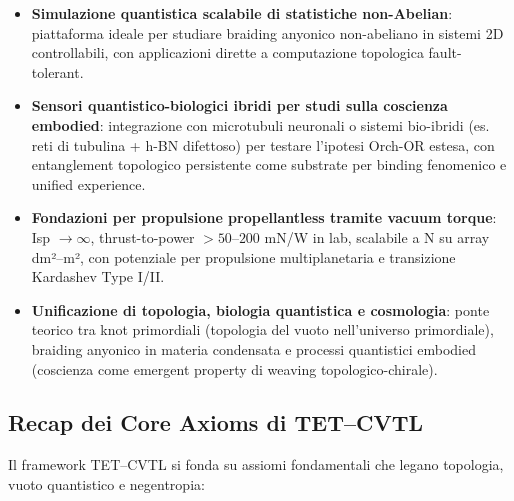 \documentclass[11pt,a4paper]{article}
\theoremstyle{plain}
\theoremstyle{definition}
\begin{document}
\begin{itemize}
    \item \textbf{Simulazione quantistica scalabile di statistiche non-Abelian}: piattaforma ideale per studiare braiding anyonico non-abeliano in sistemi 2D controllabili, con applicazioni dirette a computazione topologica fault-tolerant.
    \item \textbf{Sensori quantistico-biologici ibridi per studi sulla coscienza embodied}: integrazione con microtubuli neuronali o sistemi bio-ibridi (es. reti di tubulina + h-BN difettoso) per testare l'ipotesi Orch-OR estesa, con entanglement topologico persistente come substrate per binding fenomenico e unified experience.
    \item \textbf{Fondazioni per propulsione propellantless tramite vacuum torque}: Isp $\to \infty$, thrust-to-power $>50$--$200$ mN/W in lab, scalabile a N su array dm²–m², con potenziale per propulsione multiplanetaria e transizione Kardashev Type I/II.
    \item \textbf{Unificazione di topologia, biologia quantistica e cosmologia}: ponte teorico tra knot primordiali (topologia del vuoto nell'universo primordiale), braiding anyonico in materia condensata e processi quantistici embodied (coscienza come emergent property di weaving topologico-chirale).
\end{itemize}

\subsection{Recap dei Core Axioms di TET--CVTL}

Il framework TET--CVTL si fonda su assiomi fondamentali che legano topologia, vuoto quantistico e negentropia:
\end{document}
